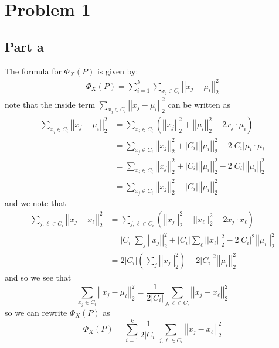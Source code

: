 \documentclass[12pt]{report}
\newcommand{\norm}[1]{\left|\left|#1\right|\right|}
\begin{document}
\maketitle
\section*{Problem 1}
\subsection*{Part a}
The formula for $\Phi_{X}(P)$ is given by:
\begin{align*}
  \Phi_{X}(P) = \sum_{i=1}^k \sum_{x_j \in C_i} \norm{x_j - \mu_i}_2^2 
\end{align*}
note that the inside term $\sum_{x_j \in C_i} \norm{x_j - \mu_i}_2^2$ can be written as
\begin{align*}
  \sum_{x_j \in C_i} \norm{x_j - \mu_i}_2^2 &= \sum_{x_j \in C_i} \left(\norm{x_j}_2^2 + \norm{\mu_i}_2^2 - 2x_j \cdot \mu_i\right) \\
                                            &= \sum_{x_j \in C_i} \norm{x_j}_2^2  + |C_i| \norm{\mu_i}_2^2 - 2|C_i| \mu_i \cdot \mu_i \\
                                            &= \sum_{x_j \in C_i} \norm{x_j}_2^2  + |C_i| \norm{\mu_i}_2^2 - 2|C_i| \norm{\mu_i}_2^2 \\
                                            &= \sum_{x_j \in C_i} \norm{x_j}_2^2 - |C_i| \norm{\mu_i}_2^2
\end{align*}
and we note that
\begin{align*}
  \sum_{j,\ell \in C_i} \norm{x_j - x_{\ell}}_2^2 &= \sum_{j,\ell \in C_i} \left(\norm{x_j}_2^2 + \norm{x_\ell}_2^2 - 2 x_j \cdot x_\ell\right) \\
                                                  &= |C_i| \sum_{j}\norm{x_j}_2^2 + |C_i| \sum_{\ell}\norm{x_\ell}_2^2 - 2|C_i|^2 \norm{\mu_i}_2^2 \\
                                                  &= 2|C_i| \left(\sum_{j}\norm{x_j}_2^2\right) - 2|C_i|^2 \norm{\mu_i}_2^2
\end{align*}
and so we see that
\begin{equation*}
\sum_{x_j \in C_i} \norm{x_j - \mu_i}_2^2 = \frac{1}{2|C_i|} \sum_{j,\ell \in C_i} \norm{x_j - x_{\ell}}_2^2
\end{equation*}
so we can rewrite $\Phi_{X}(P)$ as
\begin{equation*}
  \Phi_{X}(P) = \sum_{i=1}^k \frac{1}{2|C_i|}\sum_{j,\ell \in C_i} \norm{x_j - x_{\ell}}_2^2
\end{equation*}
\end{document}
